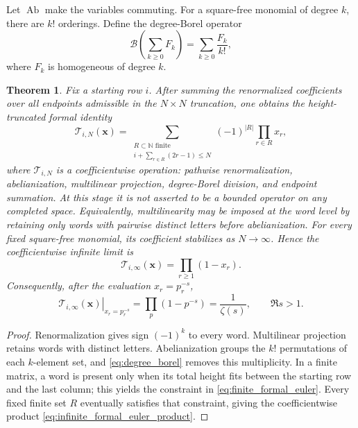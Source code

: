 \documentclass[11pt]{amsart}
\numberwithin{equation}{section}
\theoremstyle{plain}
\newtheorem{theorem}{Theorem}[section]
\theoremstyle{definition}
\theoremstyle{remark}
\newcommand{\N}{\mathbb N}
\newcommand{\Ab}{\operatorname{Ab}}
\begin{document}
Let $\Ab$ make the variables commuting.  For a square-free monomial of degree $k$, there are $k!$ orderings.  Define the degree-Borel operator
\begin{equation}
\mathcal B\left(\sum_{k\ge0}F_k\right)=\sum_{k\ge0}\frac{F_k}{k!},
\label{eq:degree_borel}
\end{equation}
where $F_k$ is homogeneous of degree $k$.

\begin{theorem}
\label{thm:formal_euler_recovery}
Fix a starting row $i$.  After summing the renormalized coefficients over all endpoints admissible in the $N\times N$ truncation, one obtains the height-truncated formal identity
\begin{equation}
\mathcal T_{i,N}(\mathbf x)
=
\sum_{\substack{R\subset\N\text{ finite}\\
i+\sum_{r\in R}(2r-1)\le N}}
(-1)^{|R|}\prod_{r\in R}x_r,
\label{eq:finite_formal_euler}
\end{equation}
where $\mathcal T_{i,N}$ is a coefficientwise operation: pathwise renormalization, abelianization, multilinear projection, degree-Borel division, and endpoint summation.  At this stage it is not asserted to be a bounded operator on any completed space.  Equivalently, multilinearity may be imposed at the word level by retaining only words with pairwise distinct letters before abelianization.  For every fixed square-free monomial, its coefficient stabilizes as $N\to\infty$.  Hence the coefficientwise infinite limit is
\begin{equation}
\mathcal T_{i,\infty}(\mathbf x)
=
\prod_{r\ge1}(1-x_r).
\label{eq:infinite_formal_euler_product}
\end{equation}
Consequently, after the evaluation $x_r=p_r^{-s}$,
\begin{equation}
\left.\mathcal T_{i,\infty}(\mathbf x)\right|_{x_r=p_r^{-s}}
=
\prod_p(1-p^{-s})
=
\frac1{\zeta(s)},
\qquad \Re s>1.
\label{eq:formal_inverse_zeta}
\end{equation}
\end{theorem}

\begin{proof}
Renormalization gives sign $(-1)^k$ to every word.  Multilinear projection retains words with distinct letters.  Abelianization groups the $k!$ permutations of each $k$-element set, and \eqref{eq:degree_borel} removes this multiplicity.  In a finite matrix, a word is present only when its total height fits between the starting row and the last column; this yields the constraint in \eqref{eq:finite_formal_euler}.  Every fixed finite set $R$ eventually satisfies that constraint, giving the coefficientwise product \eqref{eq:infinite_formal_euler_product}.
\end{proof}
\end{document}
